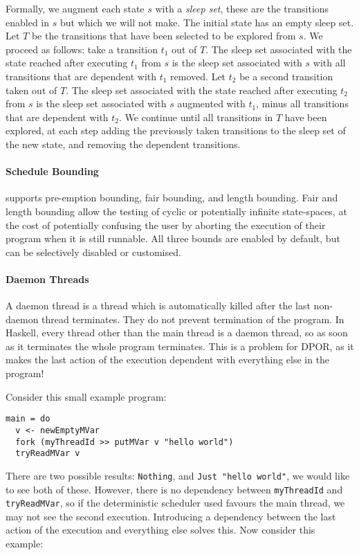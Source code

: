 Formally, we augment each state $s$ with a \emph{sleep set}, these are
the transitions enabled in $s$ but which we will not make.  The
initial state has an empty sleep set.  Let $T$ be the transitions that
have been selected to be explored from $s$.  We proceed as follows:
take a transition $t_{1}$ out of $T$.  The sleep set associated with
the state reached after executing $t_{1}$ from $s$ is the sleep set
associated with $s$ with all transitions that are dependent with
$t_{1}$ removed.  Let $t_{2}$ be a second transition taken out of $T$.
The sleep set associated with the state reached after executing
$t_{2}$ from $s$ is the sleep set associated with $s$ augmented with
$t_{1}$, minus all transitions that are dependent with $t_{2}$.  We
continue until all transitions in $T$ have been explored, at each step
adding the previously taken transitions to the sleep set of the new
state, and removing the dependent transitions.

\paragraph{Schedule Bounding}
\dejafu{} supports pre-emption bounding\cite{musuvathi2007}, fair
bounding\cite{musuvathi2008}, and length bounding.  Fair and length
bounding allow the testing of cyclic or potentially infinite
state-spaces, at the cost of potentially confusing the user by
aborting the execution of their program when it is still runnable.
All three bounds are enabled by default, but can be selectively
disabled or customised.

\paragraph{Daemon Threads}
A daemon thread is a thread which is automatically killed after the
last non-daemon thread terminates.  They do not prevent termination of
the program.  In Haskell, every thread other than the main thread is a
daemon thread, so as soon as it terminates the whole program
terminates.  This is a problem for DPOR, as it makes the last action
of the execution dependent with everything else in the program!

Consider this small example program:

\begin{verbatim}
main = do
  v <- newEmptyMVar
  fork (myThreadId >> putMVar v "hello world")
  tryReadMVar v
\end{verbatim}

There are two possible results: \verb|Nothing|, and
\verb|Just "hello world"|, we would like to see both of these.
However, there is no dependency between \verb|myThreadId| and
\verb|tryReadMVar|, so if the deterministic scheduler used favours the
main thread, we may not see the second execution.  Introducing a
dependency between the last action of the execution and everything
else solves this.  Now consider this example:

